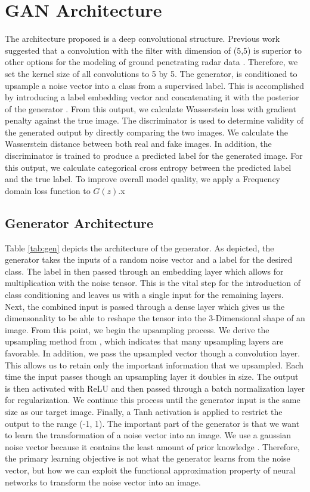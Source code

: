 \section{GAN Architecture}
\hspace{0.5in}The architecture proposed is a deep convolutional structure. Previous work suggested that a convolution with the filter with dimension of (5,5) is superior to other options for the modeling of ground penetrating radar data \cite{5x5}. Therefore, we set the kernel size of all convolutions to 5 by 5. The generator, is conditioned to upsample a noise vector into a class from a supervised label. This is accomplished by introducing a label embedding vector and concatenating it with the posterior of the generator \cite{CGAN}. From this output, we calculate Wasserstein loss with gradient penalty \cite{WGAN-GP} against the true image. The discriminator is used to determine validity of the generated output by directly comparing the two images. We calculate the Wasserstein distance between both real and fake images. In addition, the discriminator is trained to produce a predicted label for the generated image. For this output, we calculate categorical cross entropy between the predicted label and the true label. To improve overall model quality, we apply a Frequency domain loss function to $G(z)$.x 

\subsection{Generator Architecture}
 \hspace{0.5in}Table \ref{tab:gen} depicts the architecture of the generator. As depicted, the generator takes the inputs of a random noise vector and a label for the desired class. The label in then passed through an embedding layer which allows for multiplication with the noise tensor. This is the vital step for the introduction of class conditioning and leaves us with a single input for the remaining layers. Next, the combined input is passed through a dense layer which gives us the dimensonality to be able to reshape the tensor into the 3-Dimensional shape of an image. From this point, we begin the upsampling process. We derive the upsampling method from \cite{lapgan}, which indicates that many upsampling layers are favorable. In addition, we pass the upsampled vector though a convolution layer. This allows us to retain only the important information that we upsampled. Each time the input passes though an upsampling layer it doubles in size. The output is then activated with ReLU \cite{relu} and then passed through a batch normalization layer for regularization. We continue this process until the generator input is the same size as our target image. Finally, a Tanh \cite{tanh} activation is applied to restrict the output to the range (-1, 1). The important part of the generator is that we want to learn the transformation of a noise vector into an image. We use a gaussian noise vector because it contains the least amount of prior knowledge \cite{Goodfellow-et-al-2016}. Therefore, the primary learning objective is not what the generator learns from the noise vector, but how we can exploit the functional approximation property of neural networks to transform the noise vector into an image.  


